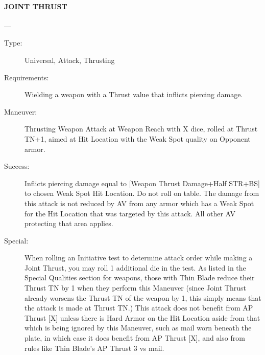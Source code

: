 \documentclass[oneside,11pt,english]{book}
\begin{document}
\paragraph{\large\label{man:JOINT THRUST} JOINT THRUST}---\quad{\large[X+2]}
\vspace{-10pt}\begin{description} 
\item [Type:] Universal, Attack, Thrusting 
\item [Requirements:] Wielding a weapon with a Thrust value that inflicts piercing damage. 
\item [Maneuver:] Thrusting Weapon Attack at Weapon Reach with X dice, rolled at Thrust TN+1, aimed at Hit 
Location with the Weak Spot quality on Opponent armor. 
\item [Success:] Inflicts piercing damage equal to [Weapon Thrust Damage+Half STR+BS] to chosen Weak Spot 
Hit Location. Do not roll on table. The damage from this attack is not reduced by AV from any armor 
which has a Weak Spot for the Hit Location that was targeted by this attack. All other AV protecting that 
area applies. 
\item [Special:] When rolling an Initiative test to determine attack order while making a Joint Thrust, you may 
roll 1 additional die in the test. 
As listed in the Special Qualities section for weapons, those with Thin Blade reduce their Thrust TN by 1 
when they perform this Maneuver (since Joint Thrust already worsens the Thrust TN of the weapon by 1, 
this simply means that the attack is made at Thrust TN.) 
This attack does not benefit from AP Thrust [X] unless there is Hard Armor on the Hit Location aside 
from that which is being ignored by this Maneuver, such as mail worn beneath the plate, in which case it 
does benefit from AP Thrust [X], and also from rules like Thin Blade’s AP Thrust 3 vs mail. 
\end{description}
\end{document}
